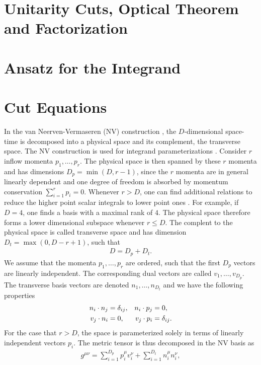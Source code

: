 \section{Unitarity Cuts, Optical Theorem and Factorization}

\section{Ansatz for the Integrand}

\section{Cut Equations}

In the van Neerven-Vermaseren (NV) construction
\cite{Neerven1984a}, the $D$-dimensional
space-time is decomposed into a physical space and its complement, the
transverse space. The NV construction is used for integrand
parameterizations \cite{Ellis:2007br,Ita:2011hi}. Consider $r$ inflow momenta $p_1,\dots,p_r$. The
physical space is then spanned by these $r$ momenta and has dimensions
$D_p=\min(D,r-1)$, since the $r$ momenta are in general linearly dependent and one degree of freedom is absorbed by momentum
conservation $\sum_{i=1}^rp_i = 0$. Whenever $r>D$, one can find
additional relations to reduce the higher point scalar integrals to
lower point ones \cite{Melrose1965}. For example, if $D=4$, one finds
a basis with a maximal rank of $4$. The physical space therefore forms
a lower dimensional subspace whenever $r\leq D$. The complent to the
physical space is called
transverse space and has dimension $D_t=\max(0,D-r+1)$, such that
\begin{align}
  D=D_p+D_t.
\end{align}
We assume that the momenta $p_1,\dots,p_r$ are ordered, such that the
first $D_p$ vectors are linearly independent. The corresponding dual
vectors are called $v_{1},\dots,v_{D_p}$. The transverse basis
vectors are denoted $n_{1},\dots,n_{D_t}$ and we have the following properties
\begin{align}
    n_i\cdot n_j &= \delta_{ij}, & n_i\cdot p_j &= 0,\\
   v_j \cdot n_i  &= 0, & v_j\cdot p_i &= \delta_{ij}.\notag
\end{align}
For the case that $r > D$, the space
is parameterized solely in terms of linearly independent vectors
$p_i$. 
 The metric tensor is thus decomposed in the NV basis as 
\begin{align}
  g^{\mu\nu} = \sum_{i=1}^{D_p}p_i^\mu v_i^\nu+\sum_{i=1}^{D_t}n_i^\mu n_i^\nu,
\end{align}
